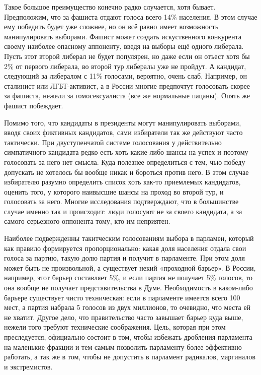 Такое большое преимущество конечно радко случается, хотя бывает. Предположим, что за фашиста отдают голоса всего 14\% населения. В этом случае ему победить будет уже сложнее, но он всё равно имеет возможность манипулировать выборами. Фашист может создать искуственного конкурента своему наиболее опасному аппоненту, введя на выборы ещё одного либерала. Пусть этот второй либерал не будет популярен, но даже если он отъест хотя бы 2\% от первого либерала, во второй тур либералы уже не пройдут. А кандидат, следующий за либералом с 11\% голосами, вероятно, очень слаб. Например, он сталинист или ЛГБТ-активист, а в России многие предпочтут голосовать скорее за фашиста, нежели за гомосексуалиста (все же нормальные пацаны). Опять же фашист побеждает.

Помимо того, что кандидаты в президенты могут манипулировать выборами, вводя своих фиктивных кандидатов, сами избиратели так же действуют часто тактически. При двуступенчатой системе голосования у действительно симпатичного кандидата редко есть хоть какие-либо шансы на успех и поэтому голосовать за него нет смысла. Куда полезнее определиться с тем, чью победу допускать не хотелось бы вообще никак и бороться против него. В этом случае избирателю разумно определить список хоть как-то приемлемых кандидатов, оценить того, у которого наивысшие шансы на проход во второй тур, и голосовать за него. Многие исследования подтверждают, что в большинстве случае именно так и происходит: люди голосуют не за своего кандидата, а за самого серьезного оппонента тому, кто им неприятен.

Наиболее подвержденны такитческим голосованиям выбора в парламен, который как правило формируется пропорционально: какая доля населения отдала свои голоса за партию, такую долю партия и получит в парламенте. При этом доля может быть не произвольной, а существует некий «проходной барьер». В России, например, этот барьер составляет 5\%, и если партия не получает 5\% голосов, то она вообще не получает представительства в Думе. Необходимость в каком-либо барьере существует чисто техническая: если в парламенте имеется всего 100 мест, а партия набрала 5 голосов из двух миллионов, то очевидно, что места ей не хватит. Другое дело, что правительство часто завышает барьер куда выше, нежели того требуют технические соображения. Цель, которая при этом преследуется, официально состоит в том, чтобы избежать дробления парламента на маленькие фракции и тем самым позволить парламенту более эффективно работать, а так же в том, чтобы не допустить в парламент радикалов, маргиналов и экстремистов.

